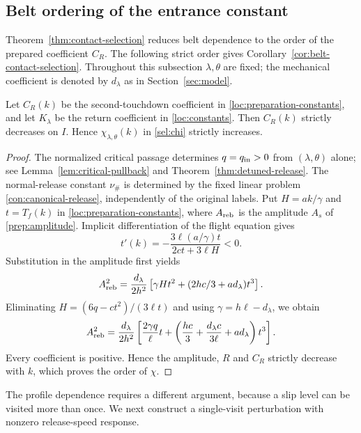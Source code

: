 \subsection{Belt ordering of the entrance constant}
\label{sec:entrance-phase}

Theorem~\ref{thm:contact-selection} reduces belt dependence to the
order of the prepared coefficient $C_R$. The following strict order
gives Corollary~\ref{cor:belt-contact-selection}.
Throughout this subsection $\lambda,\theta$ are fixed; the mechanical
coefficient is denoted by $d_\lambda$ as in Section~\ref{sec:model}.

\begin{proposition}
\label{sel:entrance-phase}
Let $C_R(k)$ be the second-touchdown coefficient in
\eqref{loc:preparation-constants}, and let $K_\lambda$ be the
return coefficient in \eqref{loc:constants}. Then $C_R(k)$ strictly decreases on $I$. Hence
$\chi_{\lambda,\theta}(k)$ in \eqref{sel:chi} strictly increases.
\end{proposition}
\begin{proof}
The normalized critical passage determines $q=q_{\rm in}>0$ from
$(\lambda,\theta)$ alone; see Lemma~\ref{lem:critical-pullback}
and Theorem~\ref{thm:detuned-release}. The normal-release constant
$\nu_\#$ is determined by the fixed linear problem
\eqref{con:canonical-release}, independently of the original labels.
Put $H=ak/\gamma$ and $t=T_f(k)$ in
\eqref{loc:preparation-constants}, where $A_{\rm reb}$ is the
amplitude $A_s$ of \eqref{prep:amplitude}.
Implicit differentiation of the flight equation gives
\[
 t'(k)=-\frac{3\ell(a/\gamma)t}{2ct+3\ell H}<0.
\]
Substitution in the amplitude first yields
\[
 A_{\rm reb}^2=\frac{d_\lambda}{2h^2}
 \left[\gamma Ht^2+(2hc/3+ad_\lambda)t^3\right].
\]
Eliminating $H=(6q-ct^2)/(3\ell t)$ and using
$\gamma=h\ell-d_\lambda$, we obtain
\begin{equation}
 A_{\rm reb}^2=\frac{d_\lambda}{2h^2}
 \left[\frac{2\gamma q}{\ell}t+
 \left(\frac{hc}{3}+\frac{d_\lambda c}{3\ell}+ad_\lambda\right)t^3\right].
 \label{sel:positive-amplitude}
\end{equation}
Every coefficient is positive. Hence the amplitude, $R$ and $C_R$
strictly decrease with $k$, which proves the order of $\chi$.

\end{proof}

The profile dependence requires a different argument, because a
slip level can be visited more than once. We next construct a
single-visit perturbation with nonzero release-speed response.
